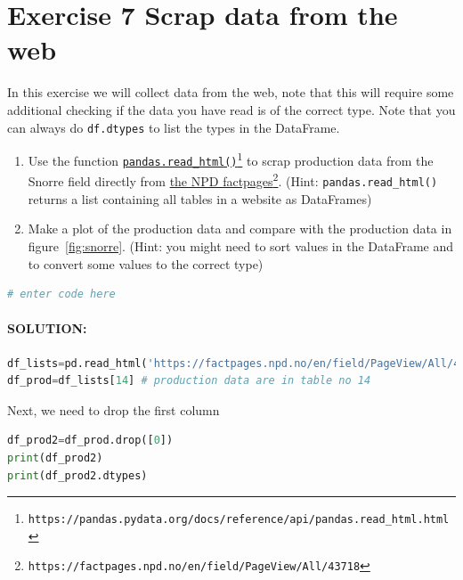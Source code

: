 \documentclass[%
twoside,                 %
final,                   %
10pt]{article}
\begin{document}
\section{Exercise 7 Scrap data from the web}
In this exercise we will collect data from the web, note that this will require some additional checking if the data you have read is of the correct type. Note that you can always do \texttt{df.dtypes} to list the types in the DataFrame.

\begin{enumerate}
\item Use the function \href{{https://pandas.pydata.org/docs/reference/api/pandas.read_html.html}}{\nolinkurl{pandas.read_html()}\footnote{\texttt{https://pandas.pydata.org/docs/reference/api/pandas.read\_html.html}}} to scrap production data from the Snorre field directly from \href{{https://factpages.npd.no/en/field/PageView/All/43718}}{the NPD factpages}\footnote{\texttt{https://factpages.npd.no/en/field/PageView/All/43718}}. (Hint: \Verb!pandas.read_html()! returns a list containing all tables in a website as DataFrames)

\item Make a plot of the production data and compare with the production data in figure~\ref{fig:snorre}. (Hint: you might need to sort values in the DataFrame and to convert some values to the correct type)
\end{enumerate}

\noindent


\begin{lstlisting}[language=Python,style=blue1bar]
# enter code here

\end{lstlisting}


\paragraph{SOLUTION:}




\begin{lstlisting}[language=Python,style=blue1bar]
df_lists=pd.read_html('https://factpages.npd.no/en/field/PageView/All/43718')
df_prod=df_lists[14] # production data are in table no 14

\end{lstlisting}


Next, we need to drop the first column




\begin{lstlisting}[language=Python,style=blue1bar]
df_prod2=df_prod.drop([0])
print(df_prod2)
print(df_prod2.dtypes)

\end{lstlisting}
\end{document}
